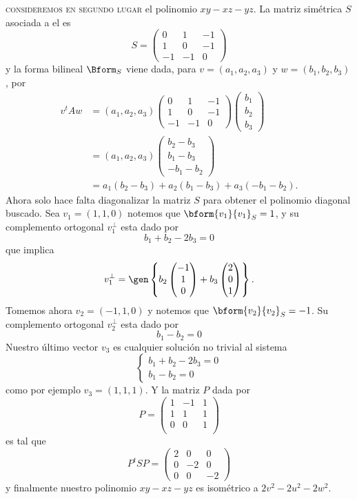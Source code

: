 	\textsc{consideremos en segundo lugar} el polinomio $xy-xz-yz$. La matriz simétrica $S$ asociada a el es
	\[ S = \begin{pmatrix}
	0 & 1 & -1 \\
	1 & 0 & -1 \\
	-1 & -1 & 0
	\end{pmatrix} \]
	y la forma bilineal $\Bform_S$ viene dada,  para $v=(a_1,a_2,a_3)$ y $w=(b_1,b_2,b_3)$, por
	\begin{align*}
	v^tAw &= (a_1,a_2,a_3) \begin{pmatrix}
	0 & 1 & -1 \\
	1 & 0 & -1 \\
	-1 & -1 & 0
	\end{pmatrix} \begin{pmatrix}
	b_1 \\ b_2 \\ b_3
	\end{pmatrix} \\
	&= (a_1,a_2,a_3) \begin{pmatrix}
	b_2-b_3 \\
	b_1-b_3 \\
	-b_1-b_2
	\end{pmatrix} \\
	&= a_1(b_2-b_3) + a_2(b_1-b_3) + a_3(-b_1-b_2).
	\end{align*}
	Ahora solo hace falta diagonalizar la matriz $S$ para obtener el polinomio diagonal buscado. Sea $v_1 = (1,1,0)$ notemos que $\bform{v_1}{v_1}_S = 1$, y su complemento ortogonal $v_1^\perp$ esta dado por
	\[ b_1+b_2-2b_3 = 0 \]
	que implica
	\[ v_1^\perp = \gen\left\{ b_2\begin{pmatrix}
	-1 \\1 \\0 
	\end{pmatrix}  + b_3\begin{pmatrix}
	2 \\ 0 \\ 1
	\end{pmatrix}\right\}. \]
	Tomemos ahora $v_2 = (-1,1,0)$ y notemos que $\bform{v_2}{v_2}_S = -1$. Su complemento ortogonal $v_2^\perp$ esta dado por
	\[ b_1-b_2 = 0 \]
	Nuestro último vector $v_3$ es cualquier solución no trivial al sistema 
	\[ \begin{cases}
	b_1+b_2-2b_3 = 0 \\
	b_1-b_2 = 0
	\end{cases} \]
	como por ejemplo $v_3=(1,1,1)$. Y la matriz $P$ dada por
	\[ P = \begin{pmatrix}
	1 & -1 & 1\\
	1 & 1 & 1\\
	0 & 0 & 1\\
	\end{pmatrix} \]
	es tal que
	\[ P^tSP = \begin{pmatrix}
	2 & 0 & 0 \\
	0 & -2 & 0 \\
	0 & 0 & -2
	\end{pmatrix} \]
	y finalmente nuestro polinomio $xy-xz-yz$ es isométrico a $2v^2-2u^2-2w^2$.
	
